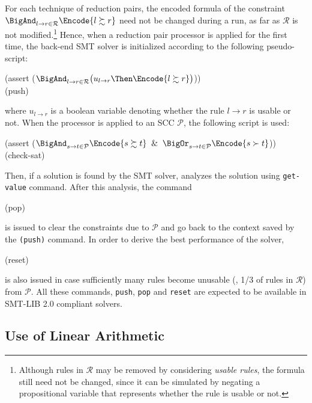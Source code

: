 \documentclass{llncs}
\def\RR{{\mathcal{R}}}
\def\PP{{\mathcal{P}}}
\def\VGS{\succsim}
\def\VGT{\succ}
\begin{document}
For each technique of reduction pairs,
the encoded formula of the constraint
$\BigAnd_{l \to r \in \RR} \Encode{l \VGS r}$ need not be changed
during a run, as far as $\RR$ is not modified.\footnote{Although rules in $\RR$ may be removed by considering \emph{usable rules},
	the formula still need not be changed, since
	it can be simulated by negating a propositional variable that
	represents whether the rule is usable or not.
}
Hence, when a reduction pair processor is applied for the first time,
the back-end SMT solver is initialized according to the following pseudo-script:
\begin{Script}
	(assert ($\BigAnd_{l \to r \in \RR} \bigl(u_{l \to r} \Then \Encode{l \VGS r}\bigr)$))\\
	(push)
\end{Script}where $u_{l \to r}$ is a boolean variable denoting
whether the rule $l \to r$ is usable or not.
When the processor is applied to an SCC $\PP$,
the following script is used:
\begin{Script}
	(assert ($\BigAnd_{s \to t \in \PP} \Encode{s \VGS t} \And
		\BigOr_{s \to t \in \PP} \Encode{s \VGT t}$))\\
	(check-sat)
\end{Script}
Then, if a solution is found by the SMT solver,
\NaTT analyzes the solution using \texttt{get-value} command.
After this analysis, the command
\begin{Script}
 	(pop)
\end{Script}
is issued to clear the constraints due to $\PP$ and go back to
the context saved by the \texttt{(push)} command.
In order to derive the best performance of the solver,
\begin{Script}
	(reset)
\end{Script}
is also issued in case sufficiently many rules
become unusable (\eg, 1/3 of rules in $\RR$) from $\PP$.
All these commands, \texttt{push}, \texttt{pop} and \texttt{reset}
are expected to be available in SMT-LIB 2.0 compliant solvers.

\subsection{Use of Linear Arithmetic}
\label{sec:linearization}
\end{document}
